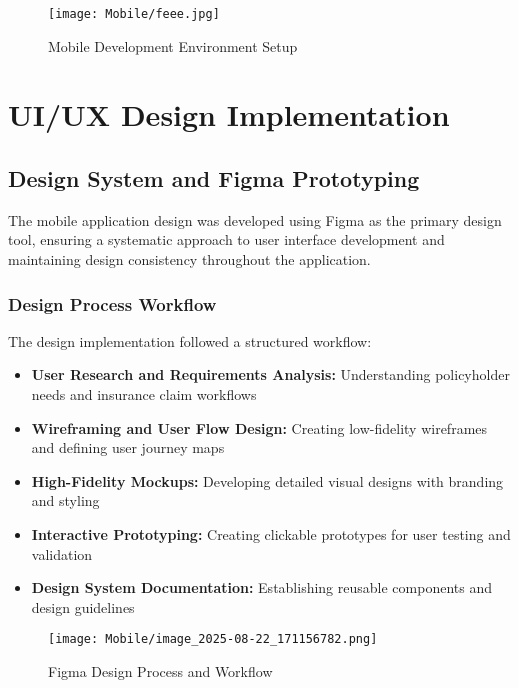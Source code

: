 \documentclass[12pt,a4paper]{report}
\begin{document}
\begin{figure}[H]
    \centering
    \texttt{[image: Mobile/feee.jpg]}
    \caption{Mobile Development Environment Setup}
    \label{fig:mobile_dev_env}
\end{figure}

\section{UI/UX Design Implementation}

\subsection{Design System and Figma Prototyping}

The mobile application design was developed using Figma as the primary design tool, ensuring a systematic approach to user interface development and maintaining design consistency throughout the application.

\subsubsection{Design Process Workflow}

The design implementation followed a structured workflow:

\begin{itemize}
    \item \textbf{User Research and Requirements Analysis:} Understanding policyholder needs and insurance claim workflows
    \item \textbf{Wireframing and User Flow Design:} Creating low-fidelity wireframes and defining user journey maps
    \item \textbf{High-Fidelity Mockups:} Developing detailed visual designs with branding and styling
    \item \textbf{Interactive Prototyping:} Creating clickable prototypes for user testing and validation
    \item \textbf{Design System Documentation:} Establishing reusable components and design guidelines
\end{itemize}

\begin{figure}[H]
    \centering
    \texttt{[image: Mobile/image\_2025-08-22\_171156782.png]}
    \caption{Figma Design Process and Workflow}
    \label{fig:figma_design}
\end{figure}
\end{document}

